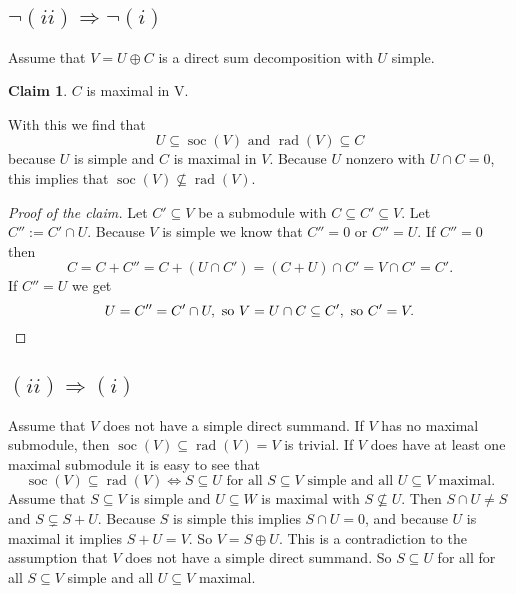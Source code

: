 \documentclass[a4paper,10pt]{article}
\theoremstyle{definition}
\newtheorem*{claim}{Claim}
\newcommand{\soc}{\operatorname{soc}}
\newcommand{\rad}{\operatorname{rad}}
\begin{document}
\section{}

\subsection*{$\neg (ii) \Rightarrow \neg (i)$}
Assume that $V = U \oplus C$ is a direct sum decomposition with $U$ simple.
\begin{claim}
 $C$ is maximal in V.
\end{claim}
With this we find that
\[
 U \subseteq \soc(V) \text{ and } \rad(V) \subseteq C
\]
because $U$ is simple and $C$ is maximal in $V$. Because $U$ nonzero with $U \cap C = 0$, this implies that $\soc(V) \nsubseteq \rad(V)$.
\begin{proof}[Proof of the claim]
 Let $C' \subseteq V$ be a submodule with $C \subseteq C' \subseteq V$. Let $C'' := C' \cap U$. Because $V$ is simple we know that $C'' = 0$ or $C'' = U$. If $C'' = 0$ then
 \[
  C = C + C'' = C + (U \cap C') = (C + U) \cap C' = V \cap C' = C'.
 \]
 If $C'' = U$ we get
 \[
  U = C'' = C' \cap U, \text{ so } V = U \cap C \subseteq C', \text{ so } C' = V. \qedhere
 \]
\end{proof}




\subsection*{$(ii) \Rightarrow (i)$}
Assume that $V$ does not have a simple direct summand. If $V$ has no maximal submodule, then $\soc(V) \subseteq \rad(V) = V$ is trivial.
If $V$ does have at least one maximal submodule it is easy to see that
\[
 \soc(V) \subseteq \rad(V) \Leftrightarrow S \subseteq U \text{ for all } S \subseteq V \text{ simple and all } U \subseteq V \text{ maximal}.
\]
Assume that $S \subseteq V$ is simple and $U \subseteq W$ is maximal with $S \nsubseteq U$. Then $S \cap U \neq S$ and $S \subsetneq S+U$. Because $S$ is simple this implies $S \cap U = 0$, and because $U$ is maximal it implies $S+U = V$. So $V = S \oplus U$. This is a contradiction to the assumption that $V$ does not have a simple direct summand. So $S \subseteq U$ for all for all $S \subseteq V$ simple and all $U \subseteq V$ maximal.





\section{}
\end{document}
